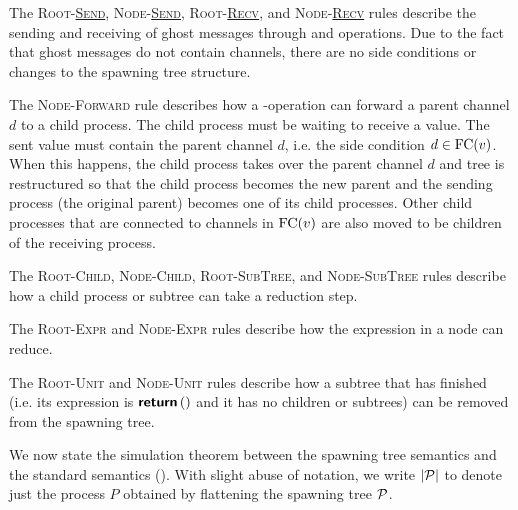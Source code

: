 The \textsc{Root-\underline{Send}}, \textsc{Node-\underline{Send}}, \textsc{Root-\underline{Recv}},
and \textsc{Node-\underline{Recv}} rules describe the sending and receiving of 
ghost messages through \SendI{} and \RecvI{} operations. Due to the fact that ghost messages
do not contain channels, there are no side conditions or changes to the spawning tree structure.

The \textsc{Node-Forward} rule describes how a \Send{}-operation can forward a
parent channel $d$ to a child process. The child process must be waiting to
receive a value. The sent value must contain the parent channel $d$, i.e. the
side condition $d \in \text{FC}({v})$. When this happens, the child process takes over
the parent channel $d$ and tree is restructured so that the child process
becomes the new parent and the sending process (the original parent) becomes one
of its child processes. Other child processes that are connected to channels in
$\text{FC}({v})$ are also moved to be children of the receiving process.

The \textsc{Root-Child}, \textsc{Node-Child}, \textsc{Root-SubTree}, and \textsc{Node-SubTree}
rules describe how a child process or subtree can take a reduction step.

The \textsc{Root-Expr} and \textsc{Node-Expr} rules describe how the expression
in a node can reduce.

The \textsc{Root-Unit} and \textsc{Node-Unit} rules describe how a subtree
that has finished (i.e. its expression is $\textbf{\textsf{return}}\,{{()}}$ and it has no children or subtrees)
can be removed from the spawning tree.

We now state the simulation theorem between the spawning tree semantics
and the standard semantics ().
With slight abuse of notation, we write $| \mathcal{P} |$ to denote just the process $P$
obtained by flattening the spawning tree $\mathcal{P}$.

